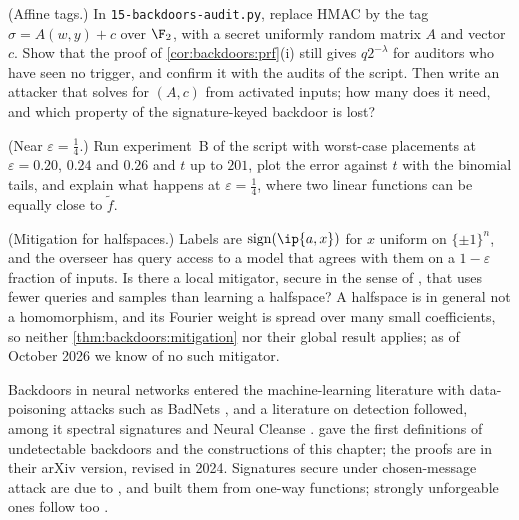 \begin{refsection}
\begin{exercises}
\item \simulation\hard (Affine tags.) In \texttt{15-backdoors-audit.py}, replace HMAC by the tag $\sigma=A(w,y)+c$ over $\F_2$, with a secret uniformly random matrix $A$ and vector $c$. Show that the proof of \cref{cor:backdoors:prf}(i) still gives $q2^{-\lambda}$ for auditors who have seen no trigger, and confirm it with the audits of the script. Then write an attacker that solves for $(A,c)$ from activated inputs; how many does it need, and which property of the signature-keyed backdoor is lost? \label{ex:backdoors:affine}

\item \simulation (Near $\varepsilon=\frac14$.) Run experiment~B of the script with worst-case placements at $\varepsilon=0.20$, $0.24$ and $0.26$ and $t$ up to $201$, plot the error against $t$ with the binomial tails, and explain what happens at $\varepsilon=\frac14$, where two linear functions can be equally close to $\tilde f$.\label{ex:backdoors:quarter}

\item \research (Mitigation for halfspaces.) Labels are $\operatorname{sign}(\ip{a,x})$ for $x$ uniform on $\{\pm1\}^n$, and the overseer has query access to a model that agrees with them on a $1-\varepsilon$ fraction of inputs. Is there a local mitigator, secure in the sense of \textcite{GoldwasserEtAl2025}, that uses fewer queries and samples than learning a halfspace? A halfspace is in general not a homomorphism, and its Fourier weight is spread over many small coefficients, so neither \cref{thm:backdoors:mitigation} nor their global result applies; as of October 2026 we know of no such mitigator.\label{ex:backdoors:halfspace}
\end{exercises}

\notesandrefs
Backdoors in neural networks entered the machine-learning literature with data-poisoning attacks such as BadNets \parencite{GuEtAl2019}, and a literature on detection followed, among it spectral signatures \parencite{TranLiMadry2018} and Neural Cleanse \parencite{WangEtAl2019}. \Textcite{GoldwasserEtAl2022} gave the first definitions of undetectable backdoors and the constructions of this chapter; the proofs are in their arXiv version, revised in 2024. Signatures secure under chosen-message attack are due to \textcite{GoldwasserMicaliRivest1988}, and \textcite{Rompel1990} built them from one-way functions; strongly unforgeable ones follow too \parencite[Theorem~3.4]{GoldwasserEtAl2022}.


\end{refsection}
